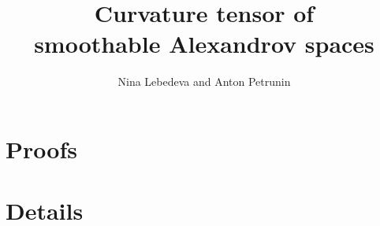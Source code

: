 \documentclass[a4paper,10pt]{article}
\begin{document}
\title{Curvature tensor of\\ smoothable Alexandrov spaces}
\date{}
\author{Nina Lebedeva and Anton Petrunin} 
\maketitle



\tableofcontents




\part*{Proofs}











%

%
%
%

\part*{Details}



%

{\sloppy
\printbibliography[heading=bibintoc]
\fussy
}
\end{document}
